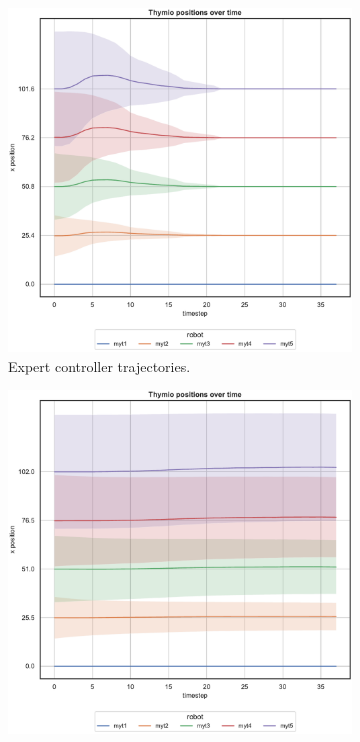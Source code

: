 \begin{figure}[H]
	\begin{center}
		\begin{subfigure}[h]{0.49\textwidth}
			\centering
			\includegraphics[width=.9\textwidth]{contents/images/net-d12/position-overtime-omniscient}%
			\caption{Expert controller trajectories.}
		\end{subfigure}
		\hfill
		\begin{subfigure}[h]{0.49\textwidth}
			\centering
			\includegraphics[width=.9\textwidth]{contents/images/net-d12/position-overtime-learned_distributed}

\end{subfigure}
\end{center}
\end{figure}
